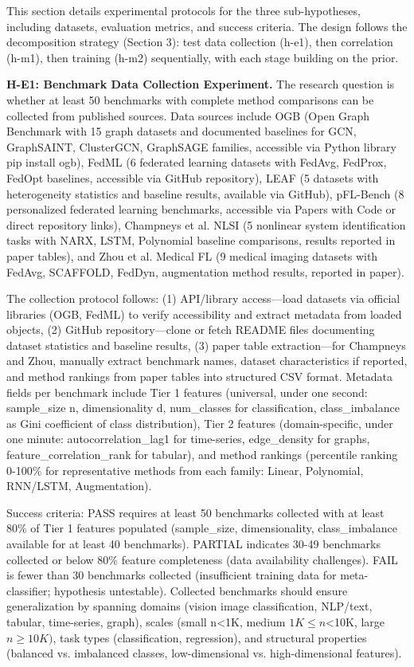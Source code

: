 
This section details experimental protocols for the three sub-hypotheses, including datasets, evaluation metrics, and success criteria. The design follows the decomposition strategy (Section 3): test data collection (h-e1), then correlation (h-m1), then training (h-m2) sequentially, with each stage building on the prior.

\textbf{H-E1: Benchmark Data Collection Experiment.} The research question is whether at least 50 benchmarks with complete method comparisons can be collected from published sources. Data sources include OGB (Open Graph Benchmark with 15 graph datasets and documented baselines for GCN, GraphSAINT, ClusterGCN, GraphSAGE families, accessible via Python library pip install ogb), FedML (6 federated learning datasets with FedAvg, FedProx, FedOpt baselines, accessible via GitHub repository), LEAF (5 datasets with heterogeneity statistics and baseline results, available via GitHub), pFL-Bench (8 personalized federated learning benchmarks, accessible via Papers with Code or direct repository links), Champneys et al. NLSI (5 nonlinear system identification tasks with NARX, LSTM, Polynomial baseline comparisons, results reported in paper tables), and Zhou et al. Medical FL (9 medical imaging datasets with FedAvg, SCAFFOLD, FedDyn, augmentation method results, reported in paper).

The collection protocol follows: (1) API/library access---load datasets via official libraries (OGB, FedML) to verify accessibility and extract metadata from loaded objects, (2) GitHub repository---clone or fetch README files documenting dataset statistics and baseline results, (3) paper table extraction---for Champneys and Zhou, manually extract benchmark names, dataset characteristics if reported, and method rankings from paper tables into structured CSV format. Metadata fields per benchmark include Tier 1 features (universal, under one second: sample\_size n, dimensionality d, num\_classes for classification, class\_imbalance as Gini coefficient of class distribution), Tier 2 features (domain-specific, under one minute: autocorrelation\_lag1 for time-series, edge\_density for graphs, feature\_correlation\_rank for tabular), and method rankings (percentile ranking 0-100\% for representative methods from each family: Linear, Polynomial, RNN/LSTM, Augmentation).

Success criteria: PASS requires at least 50 benchmarks collected with at least 80\% of Tier 1 features populated (sample\_size, dimensionality, class\_imbalance available for at least 40 benchmarks). PARTIAL indicates 30-49 benchmarks collected or below 80\% feature completeness (data availability challenges). FAIL is fewer than 30 benchmarks collected (insufficient training data for meta-classifier; hypothesis untestable). Collected benchmarks should ensure generalization by spanning domains (vision image classification, NLP/text, tabular, time-series, graph), scales (small n<1K, medium $1K\leq n$<10K, large $n\geq 10K)$, task types (classification, regression), and structural properties (balanced vs. imbalanced classes, low-dimensional vs. high-dimensional features).


